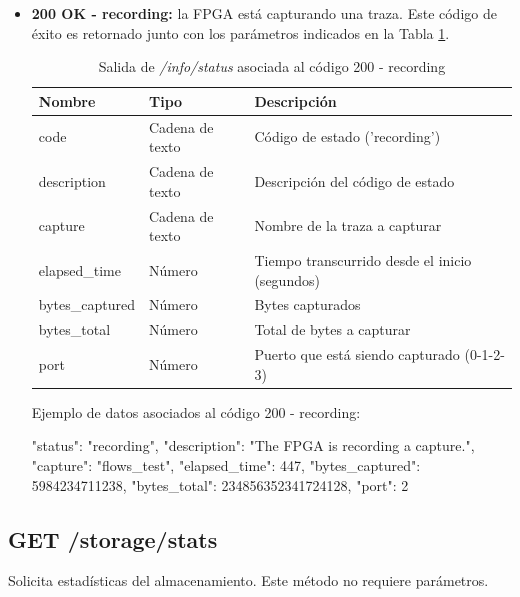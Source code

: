 \begin{itemize}
\item{\textbf{200 OK - recording:} la \gls{FPGA} está capturando una \gls{traza}. Este código de éxito es retornado junto con los parámetros indicados en la Tabla \ref{extra:api:infostatus:recording}.
\begin{table}[H]
\centering
\begin{tabular}{|l|l|l|}
\hline
\rowcolor[HTML]{F5F5F5}
\textbf{Nombre}  & \textbf{Tipo}   & \textbf{Descripción}                            \\ \hline
code             & Cadena de texto & Código de estado ('recording')                  \\ \hline
description      & Cadena de texto & Descripción del código de estado                \\ \hline
capture          & Cadena de texto & Nombre de la \gls{traza} a capturar             \\ \hline
elapsed\_time    & Número          & Tiempo transcurrido desde el inicio (segundos)  \\ \hline
bytes\_captured  & Número          & Bytes capturados                                \\ \hline
bytes\_total     & Número          & Total de bytes a capturar                       \\ \hline
port             & Número          & Puerto que está siendo capturado (0-1-2-3)      \\ \hline
\end{tabular}
\caption{Salida de \textit{/info/status} asociada al código 200 - recording}
\label{extra:api:infostatus:recording}
\end{table}
\begin{minipage}{\textwidth}
Ejemplo de datos asociados al código 200 - recording:

\begin{code}[language=json]
{
  "status": "recording",
  "description": "The FPGA is recording a capture.",
  "capture": "flows_test",
  "elapsed_time": 447,
  "bytes_captured": 5984234711238,
  "bytes_total": 234856352341724128,
  "port": 2
}
\end{code}
\end{minipage}
}

\end{itemize}

%
%
\subsection{GET /storage/stats}
Solicita estadísticas del almacenamiento. Este método no requiere parámetros.

